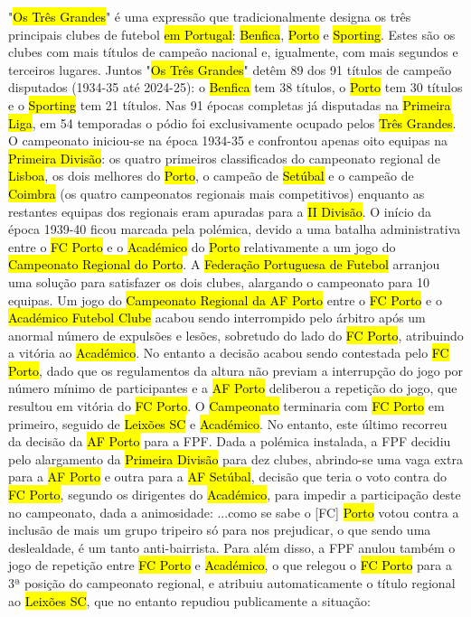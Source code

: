 \documentclass[a4paper,12pt]{article}
\begin{document}
"\hl{Os Três Grandes}" é uma expressão que tradicionalmente designa os três principais clubes de futebol \hl{em Portugal}: \hl{Benfica}, \hl{Porto} e \hl{Sporting}. Estes são os clubes com mais títulos de campeão nacional e, igualmente, com mais segundos e terceiros lugares. Juntos "\hl{Os Três Grandes}" detêm 89 dos 91 títulos de campeão disputados (1934-35 até 2024-25): o \hl{Benfica} tem 38 títulos, o \hl{Porto} tem 30 títulos e o \hl{Sporting} tem 21 títulos. Nas 91 épocas completas já disputadas na \hl{Primeira Liga}, em 54 temporadas o pódio foi exclusivamente ocupado pelos \hl{Três Grandes}.
O campeonato iniciou-se na época 1934-35 e confrontou apenas oito equipas na \hl{Primeira Divisão}: os quatro primeiros classificados do campeonato regional de \hl{Lisboa}, os dois melhores do \hl{Porto}, o campeão de \hl{Setúbal} e o campeão de \hl{Coimbra} (os quatro campeonatos regionais mais competitivos) enquanto as restantes equipas dos regionais eram apuradas para a \hl{II Divisão}. O início da época 1939-40 ficou marcada pela polémica, devido a uma batalha administrativa entre o \hl{FC Porto} e o \hl{Académico} do \hl{Porto} relativamente a um jogo do \hl{Campeonato Regional do Porto}. A \hl{Federação Portuguesa de Futebol} arranjou uma solução para satisfazer os dois clubes, alargando o campeonato para 10 equipas.
Um jogo do \hl{Campeonato Regional da AF Porto} entre o \hl{FC Porto} e o \hl{Académico Futebol Clube} acabou sendo interrompido pelo árbitro após um anormal número de expulsões e lesões, sobretudo do lado do \hl{FC Porto}, atribuindo a vitória ao \hl{Académico}. No entanto a decisão acabou sendo contestada pelo \hl{FC Porto}, dado que os regulamentos da altura não previam a interrupção do jogo por número mínimo de participantes e a \hl{AF Porto} deliberou a repetição do jogo, que resultou em vitória do \hl{FC Porto}.
O \hl{Campeonato} terminaria com \hl{FC Porto} em primeiro, seguido de \hl{Leixões SC} e \hl{Académico}. No entanto, este último recorreu da decisão da \hl{AF Porto} para a FPF. Dada a polémica instalada, a FPF decidiu pelo alargamento da \hl{Primeira Divisão} para dez clubes, abrindo-se uma vaga extra para a \hl{AF Porto} e outra para a \hl{AF Setúbal}, decisão que teria o voto contra do \hl{FC Porto}, segundo os dirigentes do \hl{Académico}, para impedir a participação deste no campeonato, dada a animosidade:
...como se sabe o [FC] \hl{Porto} votou contra a inclusão de mais um grupo tripeiro só para nos prejudicar, o que sendo uma deslealdade, é um tanto anti-bairrista.
Para além disso, a FPF anulou também o jogo de repetição entre \hl{FC Porto} e \hl{Académico}, o que relegou o \hl{FC Porto} para a 3ª posição do campeonato regional, e atribuiu automaticamente o título regional ao \hl{Leixões SC}, que no entanto repudiou publicamente a situação:
\end{document}
